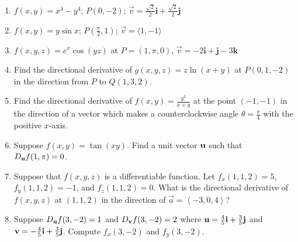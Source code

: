 \documentclass[12pt]{article}
\newif\ifans
\begin{document}
\begin{enumerate}

\item $f(x,y)=x^4-y^4$; $P(0,-2)$; $\overrightarrow{v}=\frac{\sqrt{2}}{2}\mathbf{i}+\frac{\sqrt{2}}{2}\mathbf{j}$ 

\ifans{\fbox{$\frac{32}{\sqrt{2}}$}} \fi

\item $f(x,y)=y\sin{x}$; $P\left(\frac{\pi}{2},1\right)$; $\overrightarrow{v}=\langle 1,-1 \rangle$ 

\ifans{\fbox{$-\frac{1}{\sqrt{2}}$}} \fi

\item $f(x,y,z)=e^{x}\cos{(yz)}$ at $P=(1, \pi, 0)$, $\overrightarrow{v}=-2\mathbf{i}+\mathbf{j}-3\mathbf{k}$ 

\ifans{\fbox{$-\frac{2e}{\sqrt{14}}$}} \fi

\item Find the directional derivative of $g(x,y,z)=z\ln{(x+y)}$ at $P(0,1,-2)$ in the direction from $P$ to $Q(1,3, 2)$.

\ifans{\fbox{$-\frac{6}{\sqrt{21}}$; Detailed Solution: \textcolor{blue}{\href{http://www.math.drexel.edu/classes/Calculus/resources/Math200HW/Solutions/12_200_Gradient_04.pdf}{Here}} }} \fi

\item Find the directional derivative of $f(x,y)=\frac{y^2}{x+y}$ at the point $(-1,-1)$ in the direction of a vector which makes a counterclockwise angle $\theta=\frac{\pi}{4}$ with the positive $x$-axis.

\ifans{\fbox{$\frac{\sqrt{2}}{4}$}} \fi

\item Suppose $f(x,y)=\tan{(xy)}$.  Find a unit vector ${\bf u}$ such that $D_{\bf u}f(1,\pi)=0$.

\ifans{\fbox{${\bf u}=\left\langle\frac{1}{\sqrt{\pi^2+1}},-\frac{\pi}{\sqrt{\pi^2+1}}\right\rangle$ or ${\bf u}=\left\langle-\frac{1}{\sqrt{\pi^2+1}},\frac{\pi}{\sqrt{\pi^2+1}}\right\rangle$;  Detailed Solution: \textcolor{blue}{\href{http://www.math.drexel.edu/classes/Calculus/resources/Math200HW/Solutions/12_200_Gradient_06.pdf}{Here}}}} \fi

\item Suppose that $\displaystyle f(x,y,z)$ is a differentiable function.  Let $\displaystyle f_{x}(1,1,2)=5$, $\displaystyle f_{y}(1,1,2)=-1$, and $\displaystyle f_{z}(1,1,2)=0$.  What is the directional derivative of $\displaystyle f(x,y,z)$ at $(1,1,2)$ in the direction of $\displaystyle \overrightarrow{a}=\left \langle -3, 0, 4 \right \rangle$?

\ifans{\fbox{$-3$}} \fi

\item Suppose $D_{\bf u}f(3,-2)=1$ and $D_{\bf v}f(3,-2)=2$ where ${\bf u}=\frac{4}{5}{\bf i}+\frac{3}{5}{\bf j}$ and ${\bf v}=-\frac{4}{5}{\bf i}+\frac{3}{5}{\bf j}$. Compute $f_x(3,-2)$ and $f_y(3,-2)$.

\ifans{\fbox{$f_x(3,-2)=-\frac{5}{8}$; $f_y(3,-2)=\frac{5}{2}$ }} \fi

\end{enumerate}
\end{document}
